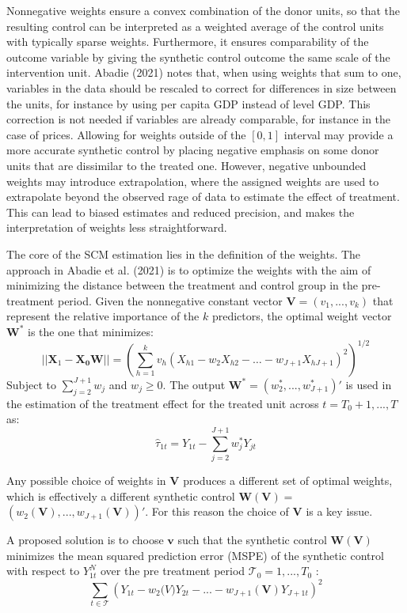 \documentclass[12pt,a4paper,draft]{article}
\begin{document}
Nonnegative weights ensure a convex combination of the donor 
units, so that the resulting control can be interpreted as a weighted average 
of the control units with typically sparse weights. 
Furthermore, it ensures comparability of the outcome variable by giving the 
synthetic control outcome the same scale of the intervention unit. 
Abadie (2021) notes that, when using weights that sum to one, variables in the data 
should be rescaled to correct for differences in size between the units, for 
instance by using per capita GDP instead of level GDP. This correction is not 
needed if variables are already comparable, for instance in the case of prices.
Allowing for weights outside of the $[0,1]$ interval may provide a more 
accurate synthetic control by placing negative emphasis on some donor units that 
are dissimilar to the treated one. However, negative unbounded weights may 
introduce extrapolation, where the assigned weights are used to extrapolate 
beyond the observed rage of data to estimate the effect of treatment. 
This can lead to biased estimates and reduced precision, and makes the interpretation 
of weights less straightforward. 

The core of the SCM estimation lies in the definition of the weights. 
The approach in Abadie et al. (2021) is to optimize the weights with the aim of 
minimizing the distance between the treatment and control group in the 
pre-treatment period. Given the nonnegative constant vector $\mathbf{V}=(v_1,...,v_k)$ 
that represent the relative importance of the $k$ predictors, the optimal 
weight vector $\mathbf{W}^*$ is the one that minimizes:
$$ || \mathbf{X}_1 - \mathbf{X_0} \mathbf{W} || = 
\left( \sum_{h=1}^k {v_h \left( X_{h1}-w_2 X_{h2}-\ldots - w_{J+1} 
X_{hJ+1} \right) ^2} \right)^{1/2} $$
Subject to $\sum_{j=2}^{J+1}w_j$ and $w_j \geq 0$. The output $\mathbf{W}^*=
\left( w_2^*,...,w_{J+1}^*\right) '$ is used in the estimation of the treatment 
effect for the treated unit across $t=T_0+1,...,T$ as:
$$ \hat{\tau}_{1t} = Y_{1t} - \sum_{j=2}^{J+1}{w^*_j Y_{jt}}$$

Any possible choice of weights in $\mathbf{V}$ produces a different set of optimal 
weights, which is effectively a different synthetic control 
$\mathbf{W}(\mathbf{V})=$ \newline $\left(w_2(\mathbf{V}),...,w_{J+1}(\mathbf{V})\right)'$.
For this reason the choice of $\mathbf{V}$ is a key issue. 

A proposed solution is to choose $\mathbf{v}$ such that the synthetic control 
$\mathbf{W}(\mathbf{V})$ minimizes the mean squared prediction error (MSPE) of 
the synthetic control with respect to $Y_{1t}^N$ over the pre treatment period
$\mathcal{T}_0 = 1,..., T_0$ : 
$$ \sum_{t\in\mathcal{T}} {\left(
    Y_{1t}-w_2\mathbf(V)Y_{2t}-...-w_{J+1}(\mathbf{V})Y_{J+1t}
\right)} ^2$$
\end{document}
